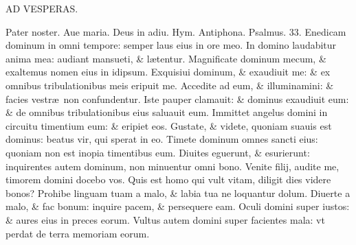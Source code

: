 \documentclass[a5paper,10pt]{book}
\def\ae{æ}
\begin{document}
\begin{multicols*}{2}
\begin{center}
AD VESPERAS.
\end{center}
\vspace{-1em}
\par \noindent \color{red} P\color{black}ater noster. Aue maria. Deus in adiu. \color{red} Hym. Antiphona. Psalmus. \hypertarget{ps33}{33.} \color{black}
Enedicam dominum in omni tempore: semper laus eius in ore meo.
\newline \color{red} I\color{black}n domino laudabitur anima mea: audiant mansueti, \& l\ae tentur.
\newline \color{red} M\color{black}agnificate dominum mecum, \& exaltemus nomen eius in idipsum.
\newline \color{red} E\color{black}xquisiui dominum, \& exaudiuit me: \& ex omnibus tribulationibus meis eripuit me.
\newline \color{red} A\color{black}ccedite ad eum, \& illuminamini: \& facies vestr\ae \ non confundentur.
\newline \color{red} I\color{black}ste pauper clamauit: \& dominus exaudiuit eum: \& de omnibus tribulationibus eius saluauit eum.
\newline \color{red} I\color{black}mmittet angelus domini in circuitu timentium eum: \& eripiet eos.
\newline \color{red} G\color{black}ustate, \& videte, quoniam suauis est dominus: beatus vir, qui sperat in eo.
\newline \color{red} T\color{black}imete dominum omnes sancti eius: quoniam non est inopia timentibus eum.
\newline \color{red} D\color{black}iuites eguerunt, \& esurierunt: inquirentes autem dominum, non minuentur omni bono.
\newline \color{red} V\color{black}enite filij, audite me, timorem domini docebo vos.
\newline \color{red} Q\color{black}uis est homo qui vult vitam, diligit dies videre bonos?
\newline \color{red} P\color{black}rohibe linguam tuam a malo, \& labia tua ne loquantur dolum.
\newline \color{red} D\color{black}iuerte a malo, \& fac bonum: inquire pacem, \& persequere eam.
\newline \color{red} O\color{black}culi domini super iustos: \& aures eius in preces eorum.
\newline \color{red} V\color{black}ultus autem domini super facientes mala: vt perdat de terra memoriam eorum.

\end{multicols*}
\end{document}
